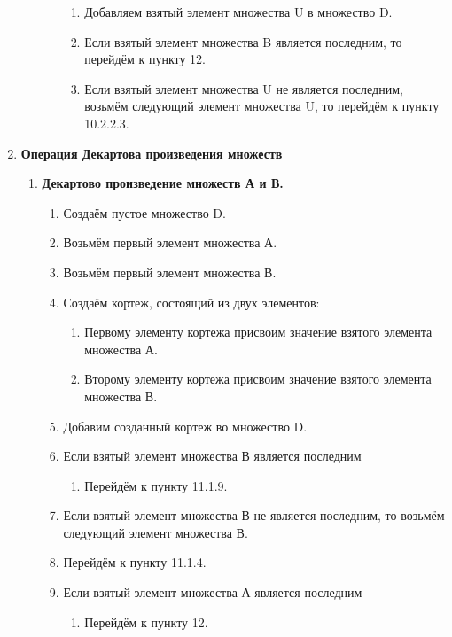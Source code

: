 \documentclass[a4paper,12pt]{extarticle}
\begin{document}
\begin{enumerate}
\begin{enumerate}[label*=\arabic*.]
\begin{enumerate}[label*=\arabic*.]
\begin{enumerate}[label*=\arabic*.]
          \item Добавляем взятый элемент множества U в множество D.
          \item Если взятый элемент множества B является последним, то перейдём к пункту 12.
          \item Если взятый элемент множества U не является последним, возьмём следующий элемент множества U, то перейдём к пункту 10.2.2.3.
        \end{enumerate}
      \end{enumerate}
    \end{enumerate}
  \item \textbf{Операция Декартова произведения множеств}
  \begin{enumerate}[label*=\arabic*.]
    \item \textbf{Декартово произведение множеств А и В.}
    \begin{enumerate}[label*=\arabic*.]
      \item Создаём пустое множество D.
      \item Возьмём первый элемент множества А.
      \item Возьмём первый элемент множества В.
      \item Создаём кортеж, состоящий из двух элементов:
      \begin{enumerate}[label*=\arabic*.]
        \item Первому элементу кортежа присвоим значение взятого элемента множества А.
        \item Второму элементу кортежа присвоим значение взятого элемента множества В.
      \end{enumerate}
      \item Добавим созданный кортеж во множество D.
      \newpage
      \item Если взятый элемент множества В является последним
      \begin{enumerate}[label*=\arabic*.]
        \item Перейдём к пункту 11.1.9.
      \end{enumerate}
      \item Если взятый элемент множества В не является последним, то возьмём следующий элемент множества В.
      \item Перейдём к пункту 11.1.4.
      \item Если взятый элемент множества А является последним
      \begin{enumerate}[label*=\arabic*.]
        \item Перейдём к пункту 12.

\end{enumerate}
\end{enumerate}
\end{enumerate}
\end{enumerate}
\end{document}

